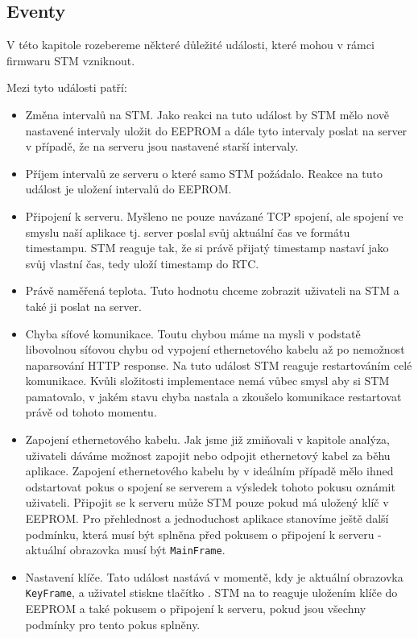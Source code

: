 
\subsection{Eventy}
V této kapitole rozebereme některé důležité události, které mohou v rámci firmwaru STM vzniknout.

Mezi tyto události patří:
\begin{itemize}
  \item Změna intervalů na STM.
    Jako reakci na tuto událost by STM mělo nově nastavené intervaly uložit do EEPROM a dále
    tyto intervaly poslat na server v případě, že na serveru jsou nastavené starší intervaly.

  \item Příjem intervalů ze serveru o které samo STM požádalo. Reakce na tuto událost je
    uložení intervalů do EEPROM.

  \item Připojení k serveru. Myšleno ne pouze navázané TCP spojení, ale spojení ve smyslu naší
    aplikace tj. server poslal svůj aktuální čas ve formátu timestampu.
    STM reaguje tak, že si právě přijatý timestamp nastaví jako svůj vlastní čas, tedy
    uloží timestamp do RTC.

  \item Právě naměřená teplota. Tuto hodnotu chceme zobrazit uživateli na STM a také ji poslat
    na server.

  \item Chyba síťové komunikace. Toutu chybou máme na mysli v podstatě libovolnou síťovou chybu
    od vypojení ethernetového kabelu až po nemožnost naparsování HTTP response.
    Na tuto událost STM reaguje restartováním celé komunikace.
    Kvůli složitosti implementace nemá vůbec smysl aby si STM pamatovalo, v jakém stavu chyba
    nastala a zkoušelo komunikace restartovat právě od tohoto momentu.

  \item Zapojení ethernetového kabelu. Jak jsme již zmiňovali v kapitole analýza, uživateli
    dáváme možnost zapojit nebo odpojit ethernetový kabel za běhu aplikace.
    Zapojení ethernetového kabelu by v ideálním případě mělo ihned odstartovat pokus o spojení se serverem
    a výsledek tohoto pokusu oznámit uživateli.
    Připojit se k serveru může STM pouze pokud má uložený klíč v EEPROM.
    Pro přehlednost a jednoduchost aplikace stanovíme ještě další podmínku, která musí být splněna
    před pokusem o připojení k serveru - aktuální obrazovka musí být \texttt{MainFrame}.

  \item Nastavení klíče. Tato událost nastává v momentě, kdy je aktuální obrazovka \texttt{KeyFrame},
    a uživatel stiskne tlačítko .
    STM na to reaguje uložením klíče do EEPROM a také pokusem o připojení k serveru,
    pokud jsou všechny podmínky pro tento pokus splněny.
\end{itemize}

